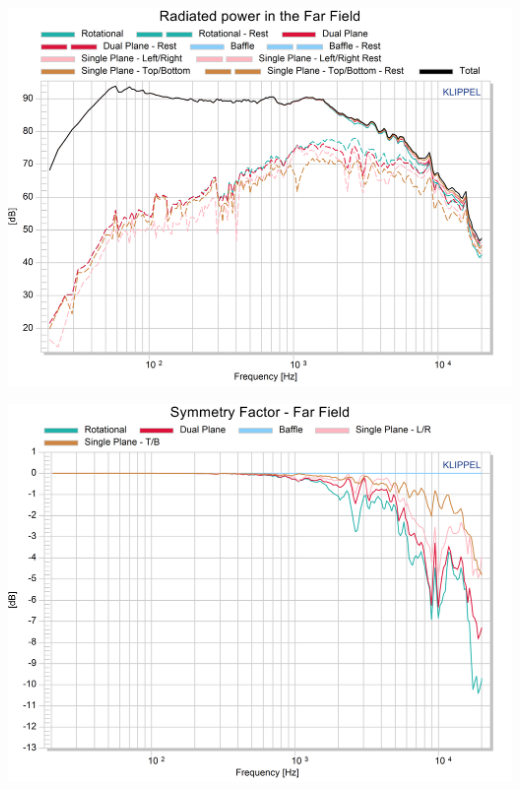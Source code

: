 \documentclass{report}
\begin{document}
\begin{minipage}{0.5\textwidth}
\begin{center}
	\includegraphics[width=.9\textwidth]{Sym/Rad_Pow_OvalSpkr} 
    \captionsetup{hypcap=false} 
	\label{fig:rad_pow_Oval}
\end{center}
\end{minipage}
\begin{minipage}{0.5\textwidth}
\begin{center}
	\includegraphics[width=.9\textwidth]{Sym/Sym_Fact_OvalSpkr} 
    \captionsetup{hypcap=false} 
	\label{fig:sym_fact_Oval}
\end{center}
\end{minipage}
\vspace{0.1cm}
\end{document}
